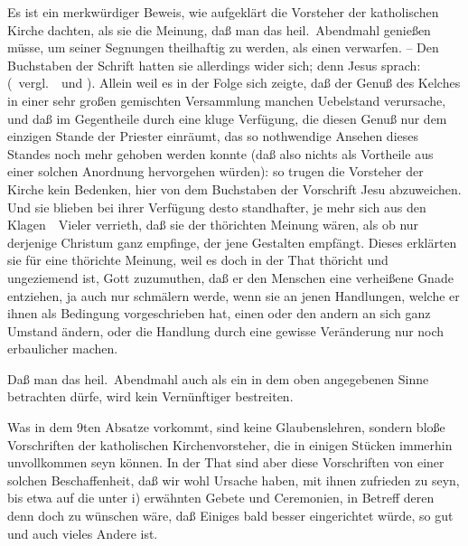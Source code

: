 \begin{aufza}\setcounter{enumi}{6}
\item Es ist ein merkwürdiger Beweis, wie aufgeklärt die Vorsteher der katholischen Kirche dachten, als sie die Meinung, daß man das heil.\ Abendmahl  genießen müsse, um seiner Segnungen theilhaftig zu werden, als einen  verwarfen. -- Den Buchstaben der Schrift hatten sie allerdings wider sich; denn Jesus sprach:  (\ vergl.\ \ und ). Allein weil es in der Folge sich zeigte, daß der Genuß des Kelches in einer sehr großen gemischten Versammlung manchen Uebelstand verursache, und daß im Gegentheile durch eine kluge Verfügung, die diesen Genuß nur dem einzigen Stande der Priester einräumt, das so nothwendige Ansehen dieses Standes noch mehr gehoben werden konnte (daß also nichts als Vortheile aus einer solchen Anordnung hervorgehen würden): so trugen die Vorsteher der Kirche kein Bedenken, hier von dem Buchstaben der Vorschrift Jesu abzuweichen. Und sie blieben bei ihrer Verfügung desto standhafter, je mehr sich aus den Klagen~\ Vieler verrieth, daß sie der thörichten Meinung wären, als ob nur derjenige Christum ganz empfinge, der jene  Gestalten empfängt. Dieses erklärten sie für eine thörichte Meinung, weil es doch in der That thöricht und ungeziemend ist, Gott zuzumuthen, daß er den Menschen eine verheißene Gnade entziehen, ja auch nur schmälern werde, wenn sie an jenen Handlungen, welche er ihnen als Bedingung vorgeschrieben hat, einen oder den andern an sich ganz  Umstand  ändern, oder die Handlung durch eine gewisse Veränderung nur noch erbaulicher machen.
\item Daß man das heil.\ Abendmahl auch als ein  in dem oben angegebenen Sinne betrachten dürfe, wird kein Vernünftiger bestreiten.
\item Was in dem 9ten Absatze vorkommt, sind keine Glaubenslehren, sondern bloße Vorschriften der katholischen Kirchenvorsteher, die in einigen Stücken immerhin unvollkommen seyn können. In der That sind aber diese Vorschriften von einer solchen Beschaffenheit, daß wir wohl Ursache haben, mit ihnen zufrieden zu seyn, bis etwa auf die unter i) erwähnten Gebete und Ceremonien, in Betreff deren denn doch zu wünschen wäre, daß Einiges bald besser eingerichtet würde, so gut und  auch vieles Andere ist.
\end{aufza}

